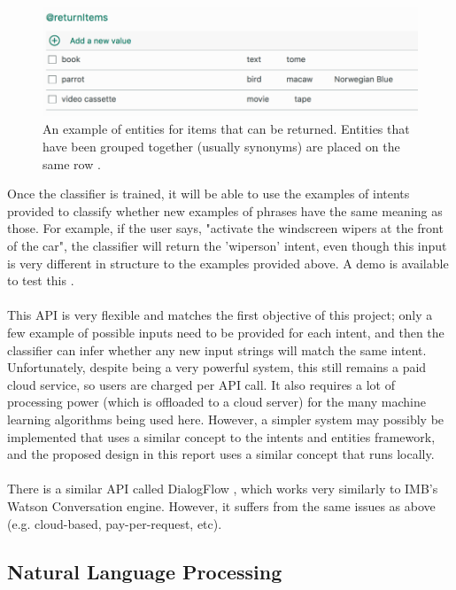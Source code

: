 \documentclass[12pt]{article}
\begin{document}
\begin{center}
\begin{figure}[H]
  \includegraphics[width=\textwidth]{returnitems.png}
  \caption{An example of entities for items that can be returned. Entities that have been grouped together (usually synonyms) are placed on the same row \cite{RefWorks:34}.}
\end{figure}
\end{center}
Once the classifier is trained, it will be able to use the examples of intents provided to classify whether new examples of phrases have the same meaning as those. For example, if the user says, "activate the windscreen wipers at the front of the car", the classifier will return the 'wipers\textunderscore on' intent, even though this input is very different in structure to the examples provided above. A demo is available to test this \cite{RefWorks:32}.
\\
\\
This API is very flexible and matches the first objective of this project; only a few example of possible inputs need to be provided for each intent, and then the classifier can infer whether any new input strings will match the same intent. Unfortunately, despite being a very powerful system, this still remains a paid cloud service, so users are charged per API call. It also requires a lot of processing power (which is offloaded to a cloud server) for the many machine learning algorithms being used here. However, a simpler system may possibly be implemented that uses a similar concept to the intents and entities framework, and the proposed design in this report uses a similar concept that runs locally.
\\
\\
There is a similar API called DialogFlow \cite{RefWorks:106}, which works very similarly to IMB's Watson Conversation engine. However, it suffers from the same issues as above (e.g. cloud-based, pay-per-request, etc).

\subsection{Natural Language Processing}
\end{document}
